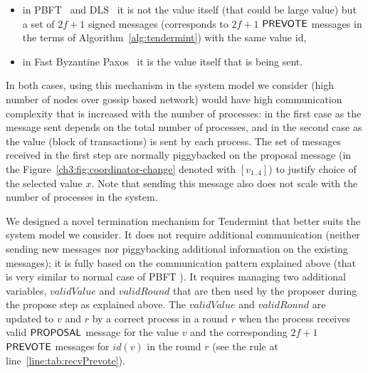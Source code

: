 \begin{itemize}
	\item in PBFT~\cite{CL99:osdi} and DLS~\cite{DLS88:jacm} it is not the value itself (that could be large value) but a set of $2f+1$ signed messages (corresponds to $2f+1$ $\mathsf{PREVOTE}$ messages in the terms of Algorithm~\ref{alg:tendermint}) with the same value id,
	\item in Fast Byzantine Paxos~\cite{MA06:tdsc} it is the value itself that is being sent.  
\end{itemize}

In both cases, using this mechanism in the system model we consider (high number of nodes over gossip based network) would have high communication complexity that is increased with the number of processes: in the first case as the message sent depends on the total number of processes, and in the second case as the value (block of transactions) is sent by each process. The set of messages received in the first step are normally piggybacked on the proposal message (in the Figure~\ref{ch3:fig:coordinator-change} denoted with $[v_{1..4}]$) to justify choice of the selected value $x$. Note that sending this message also does not scale with the number of processes in the system.   

We designed a novel termination mechanism for Tendermint that better suits the system model we consider. It does not require additional communication (neither sending new messages nor piggybacking additional information on the existing messages); it is
fully based on the communication pattern explained above (that is very similar to normal case of PBFT \cite{CL99:osdi}). It requires managing two additional variables, $validValue$ and $validRound$ that are then used by the proposer during the propose step as explained above.   
The $validValue$ and $validRound$ are updated to $v$ and $r$ by a correct process in a round $r$ when the process receives valid $\mathsf{PROPOSAL}$ message for the value $v$ and the corresponding $2f+1$ $\mathsf{PREVOTE}$ messages for $id(v)$ in the round $r$ (see the rule at line~\ref{line:tab:recvPrevote}).

